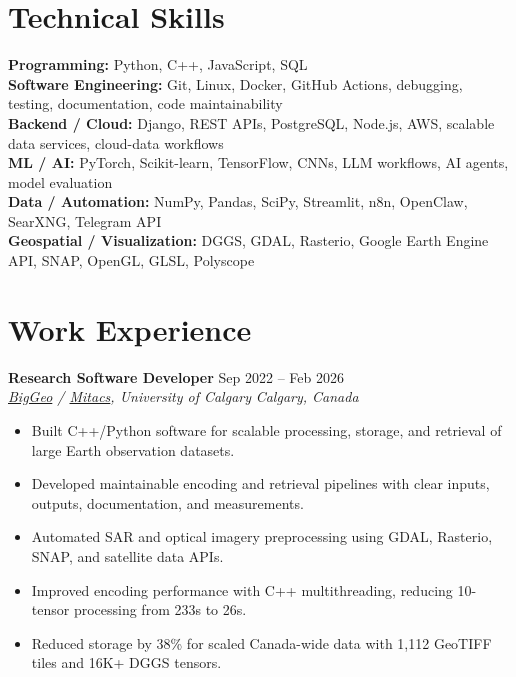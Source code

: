 \documentclass[a4paper,10pt]{article}
\newcommand{\resumeSubheading}[4]{
    \textbf{#1} \hfill #2 \\
    \textit{#3} \hfill \textit{#4}
}
\begin{document}
\section*{Technical Skills}

\textbf{Programming:} Python, C++, JavaScript, SQL \\
\textbf{Software Engineering:} Git, Linux, Docker, GitHub Actions, debugging, testing, documentation, code maintainability \\
\textbf{Backend / Cloud:} Django, REST APIs, PostgreSQL, Node.js, AWS, scalable data services, cloud-data workflows \\
\textbf{ML / AI:} PyTorch, Scikit-learn, TensorFlow, CNNs, LLM workflows, AI agents, model evaluation \\
\textbf{Data / Automation:} NumPy, Pandas, SciPy, Streamlit, n8n, OpenClaw, SearXNG, Telegram API \\
\textbf{Geospatial / Visualization:} DGGS, GDAL, Rasterio, Google Earth Engine API, SNAP, OpenGL, GLSL, Polyscope


\section*{Work Experience}

\resumeSubheading
{Research Software Developer}
{Sep 2022 -- Feb 2026}
{\href{https://biggeo.com}{BigGeo} / \href{https://www.mitacs.ca/}{Mitacs}, University of Calgary}
{Calgary, Canada}
\begin{itemize}[leftmargin=0.25in]
    \item Built C++/Python software for scalable processing, storage, and retrieval of large Earth observation datasets.
    \item Developed maintainable encoding and retrieval pipelines with clear inputs, outputs, documentation, and measurements.
    \item Automated SAR and optical imagery preprocessing using GDAL, Rasterio, SNAP, and satellite data APIs.
    \item Improved encoding performance with C++ multithreading, reducing 10-tensor processing from 233s to 26s.
    \item Reduced storage by 38\% for scaled Canada-wide data with 1,112 GeoTIFF tiles and 16K+ DGGS tensors.
\end{itemize}
\end{document}
